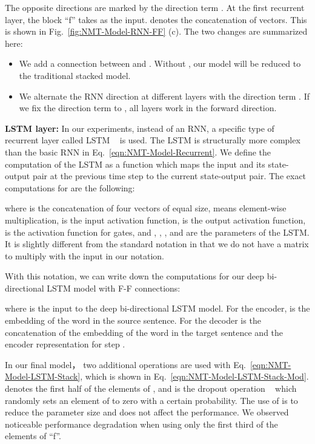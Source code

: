 \documentclass[11pt,letterpaper]{article}
\begin{document}
The opposite directions are marked by the direction term . At the first recurrent layer, the block ``f'' takes  as the input.
 denotes the concatenation of  vectors. This is shown in Fig.~\ref{fig:NMT-Model-RNN-FF} (c). The two changes are summarized here:
\begin{itemize}
\item We add a connection between  and . Without , our model will be reduced to the traditional stacked model.
\item We alternate the RNN direction at different layers  with the direction term . If we fix the direction term to
    , all layers work in the forward direction.
\end{itemize}
\noindent\textbf{LSTM layer:} In our experiments, instead of an RNN, a specific type of recurrent layer called LSTM
~\cite{Hochreiter-Schmidhuber-NC1997,Graves-Schmidhuber-TPAMI2009}  is used. The LSTM is structurally more complex than the basic RNN
in Eq.~\ref{eqn:NMT-Model-Recurrent}.   We define the computation of the LSTM as a function which maps the input  and its state-output
 pair  at the previous time step to the current state-output pair. The exact computations for  are the following:

where  is the concatenation of four vectors of equal size,
 means element-wise multiplication,  is the input activation function,
 is the output activation function,  is the activation function for gates,
and , , , and  are the parameters of the LSTM. It is slightly different from the standard notation
in that we do not  have a matrix to multiply with the input  in our notation.

With this notation, we can write down the computations for our deep bi-directional LSTM model with F-F connections:

where  is the input to the deep bi-directional \mbox{LSTM} model. For the encoder,  is the embedding of the
 word in the source sentence. For the decoder  is the concatenation of the embedding of the  word in the target
sentence and the encoder representation for step .

In our final model， two additional operations are used with Eq.~\ref{eqn:NMT-Model-LSTM-Stack}, which is  shown in
Eq.~\ref{eqn:NMT-Model-LSTM-Stack-Mod}.  denotes the first half of the elements of , and
 is the dropout operation ~\cite{Hinton-Salakhutdinov-Arxiv2012} which randomly sets an element of  to zero with a
certain probability. The use of  is to reduce the parameter size and does not affect the performance. We
observed noticeable performance degradation when using only the first third of the elements of ``f''.
\end{document}
